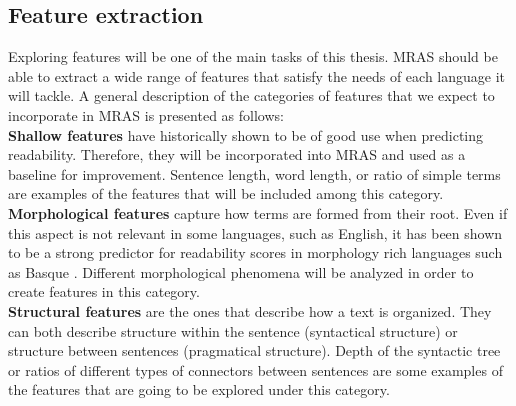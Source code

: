 \documentclass[12pt]{article}
\begin{document}




\subsection{Feature extraction}
Exploring features will be one of the main tasks of this thesis. MRAS should be able to extract a wide range of features that satisfy the needs of each language it will tackle. A general description of the categories of features that we expect to incorporate in MRAS is presented as follows:\\


\noindent
\textbf{Shallow features} \cite{flesch1948new,chall1995readability,albright1996readability} have historically shown to be of good use when predicting readability. Therefore, they will be incorporated into MRAS and used as a baseline for improvement. Sentence length, word length, or ratio of simple terms are examples of the features that will be included among this category.\\



\noindent
\textbf{Morphological features} capture how terms are formed from their root. Even if this  aspect is not relevant in some languages, such as English, it has been shown to be a strong predictor for readability scores in morphology rich languages such as Basque \cite{gonzalez2014simple}. Different morphological phenomena will be analyzed in order to create features in this category.\\

\noindent
\textbf{Structural features} are the ones that describe how a text is organized. They can both describe structure within the sentence (syntactical structure) or structure between sentences (pragmatical structure). Depth of the syntactic tree or ratios of different types of connectors between sentences are some examples of the features that are going to be explored under this category.\\
\end{document}
